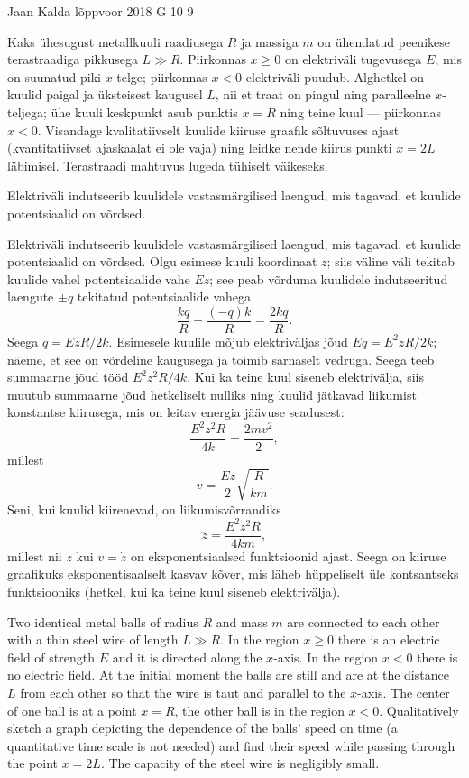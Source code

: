 {Jaan Kalda} %
{lõppvoor} %
{2018} %
{G 10} %
{9} %
{
\ifStatement
Kaks ühesugust metallkuuli raadiusega $R$ ja massiga $m$ on ühendatud peenikese terastraadiga pikkusega $L\gg R$. Piirkonnas $x\ge 0$ on elektriväli tugevusega $E$, mis on suunatud piki $x$-telge; piirkonnas $x< 0$ elektriväli puudub. Alghetkel on kuulid paigal ja üksteisest kaugusel $L$, nii et traat on pingul ning paralleelne $x$-teljega; ühe kuuli keskpunkt asub punktis $x=R$ ning teine kuul --- piirkonnas $x<0$. Visandage kvalitatiivselt kuulide kiiruse graafik sõltuvuses ajast (kvantitatiivset ajaskaalat ei ole vaja) ning leidke nende kiirus punkti $x=2L$ läbimisel. Terastraadi mahtuvus lugeda tühiselt väikeseks.
\fi


\ifHint
Elektriväli indutseerib kuulidele vastasmärgilised laengud, mis tagavad, et kuulide potentsiaalid on võrdsed.
\fi


\ifSolution
Elektriväli indutseerib kuulidele vastasmärgilised laengud, mis tagavad, et kuulide potentsiaalid on võrdsed. Olgu esimese kuuli koordinaat $z$; siis väline väli tekitab kuulide vahel potentsiaalide vahe $Ez$; see peab võrduma kuulidele indutseeritud laengute $\pm q$ tekitatud potentsiaalide vahega
\[
\frac{kq}{R}-\frac{(-q)k}{R}=\frac{2kq}{R}.
\]
Seega $q=EzR/2k$. Esimesele kuulile mõjub elektriväljas jõud $Eq=E^2zR/2k$; näeme, et see on võrdeline kaugusega ja toimib sarnaselt vedruga. Seega teeb summaarne jõud tööd $E^2z^2R/4k$. Kui ka teine kuul siseneb elektrivälja, siis muutub summaarne jõud hetkeliselt nulliks ning kuulid jätkavad liikumist konstantse kiirusega, mis on leitav energia jäävuse seadusest: 
\[
\frac{E^2z^2R}{4k}=\frac{2mv^2}{2},
\]
millest
\[
v=\frac{Ez}{2}\sqrt{\frac{R}{km}}.
\]
Seni, kui kuulid kiirenevad, on liikumisvõrrandiks
\[
\ddot z=\frac{E^2z^2R}{4km},
\]
millest nii $z$ kui $v=\dot z$ on eksponentsiaalsed funktsioonid ajast. Seega on kiiruse graafikuks eksponentisaalselt kasvav kõver, mis läheb hüppeliselt üle kontsantseks funktsiooniks (hetkel, kui ka teine kuul siseneb elektrivälja).
\fi


\ifEngStatement
Two identical metal balls of radius $R$ and mass $m$ are connected to each other with a thin steel wire of length $L\gg R$. In the region $x\ge 0$ there is an electric field of strength $E$ and it is directed along the $x$-axis. In the region $x< 0$ there is no electric field. At the initial moment the balls are still and are at the distance $L$ from each other so that the wire is taut and parallel to the $x$-axis. The center of one ball is at a point $x=R$, the other ball is in the region $x<0$. Qualitatively sketch a graph depicting the dependence of the balls’ speed on time (a quantitative time scale is not needed) and find their speed while passing through the point $x=2L$. The capacity of the steel wire is negligibly small.
\fi


}
